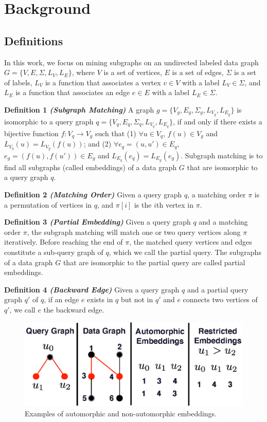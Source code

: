 \section{Background}
\subsection{Definitions}
In this work, we focus on mining subgraphs on an undirected labeled data graph $G=\{V,E,\Sigma,L_V,L_E\}$, where $V$ is a set of vertices, $E$ is a set of edges, $\Sigma$ is a set of labels, $L_V$ is a function that associates a vertex $v \in V$ with a label $L_V \in \Sigma$, and $L_E$ is a function that associates an edge $e \in E$ with a label $L_E \in \Sigma$.

\noindent
\textbf{Definition 1 \emph{(Subgraph Matching)}} A graph $g=\{V_g,E_g,\Sigma_g,L_{V_g},L_{E_g}\}$ is isomorphic to a query graph $q=\{V_q,E_q,\Sigma_q,L_{V_q},L_{E_q}\}$, if and only if there exists a bijective function $f: V_q \rightarrow V_g$ such that (1) $\forall u \in V_q$, $f(u) \in V_g$ and $L_{V_q}(u) = L_{V_g}(f(u))$; and (2) $\forall e_q=(u,u') \in E_q$, $e_g=(f(u),f(u')) \in E_g$ and $L_{E_q}(e_q)=L_{E_g}(e_g)$. Subgraph matching is to find all subgraphs (called embeddings) of a data graph $G$ that are isomorphic to a query graph $q$.

\noindent
\textbf{Definition 2 \emph{(Matching Order)}} Given a query graph $q$, a matching order $\pi$ is a permutation of vertices in $q$, and $\pi[i]$ is the $i$th vertex in $\pi$.

\noindent
\textbf{Definition 3 \emph{(Partial Embedding)}} Given a query graph $q$ and a matching order $\pi$, the subgraph matching will match one or two query vertices along $\pi$ iteratively. Before reaching the end of $\pi$, the matched query vertices and edges constitute a sub-query graph of $q$, which we call the partial query. The subgraphs of a data graph $G$ that are isomorphic to the partial query are called partial embeddings.

\noindent
\textbf{Definition 4 \emph{(Backward Edge)}} Given a query graph $q$ and a partial query graph $q'$ of $q$, if an edge $e$ exists in $q$ but not in $q'$ and $e$ connects two vertices of $q'$, we call $e$ the backward edge.

\begin{figure}
\centering
\includegraphics[width=\columnwidth]{./figure/automorphism.eps}
\caption{Examples of automorphic and non-automorphic embeddings.}	
\label{fig:automo}
\end{figure}

